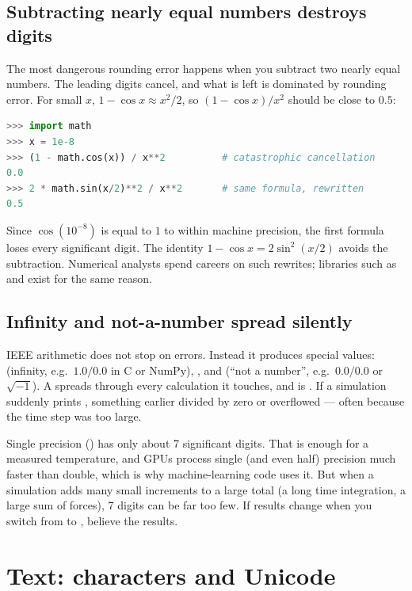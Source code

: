 \subsection*{Subtracting nearly equal numbers destroys digits}

The most dangerous rounding error happens when you subtract two nearly equal numbers. The
leading digits cancel, and what is left is dominated by rounding error. For small $x$,
$1-\cos x \approx x^2/2$, so $(1-\cos x)/x^2$ should be close to $0.5$:
\begin{lstlisting}[language=Python]
>>> import math
>>> x = 1e-8
>>> (1 - math.cos(x)) / x**2          # catastrophic cancellation
0.0
>>> 2 * math.sin(x/2)**2 / x**2       # same formula, rewritten
0.5
\end{lstlisting}
Since $\cos(10^{-8})$ is equal to $1$ to within machine precision, the first formula
loses every significant digit. The identity $1-\cos x = 2\sin^2(x/2)$ avoids the
subtraction. Numerical analysts spend careers on such rewrites; libraries such as
 and  exist for the same reason.

\subsection*{Infinity and not-a-number spread silently}

IEEE arithmetic does not stop on errors. Instead it produces special values:
 (infinity, e.g.\ $1.0/0.0$ in C or NumPy), , and  (``not
a number'', e.g.\ $0.0/0.0$ or $\sqrt{-1}$). A  spreads through every
calculation it touches, and  is . If a simulation suddenly
prints , something earlier divided by zero or overflowed --- often because the
time step was too large.

\begin{engnote}
Single precision () has only about 7 significant digits. That is enough
for a measured temperature, and GPUs process single (and even half) precision much faster
than double, which is why machine-learning code uses it. But when a simulation adds many
small increments to a large total (a long time integration, a large sum of forces), 7
digits can be far too few. If results change when you switch from  to
, believe the  results.
\end{engnote}

\section{Text: characters and Unicode}

